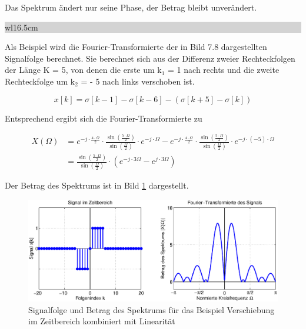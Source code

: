 \noindent Das Spektrum \"{a}ndert nur seine Phase, der Betrag bleibt unver\"{a}ndert.\bigskip

\noindent
\colorbox{lightgray}{%
%
\renewcommand\arraystretch{0.6}%
\begin{tabular}{ wl{16.5cm} }
{}
\end{tabular}%
}\medskip

\noindent Als Beispiel wird die Fourier-Transformierte der in Bild 7.8 dargestellten Signalfolge berechnet. Sie berechnet sich aus der Differenz zweier Rechteckfolgen der L\"{a}nge K = 5, von denen die erste um k${}_{1}$ = 1 nach rechts und die zweite Rechteckfolge um k${}_{2}$ = - 5 nach links verschoben ist. 

\begin{equation}\label{eq:sevenfiftyseven}
x\left[k\right]=\sigma \left[k-1\right]-\sigma \left[k-6\right]-\left(\sigma \left[k+5\right]-\sigma \left[k\right]\right)
\end{equation}

\noindent Entsprechend ergibt sich die Fourier-Transformierte zu

\begin{equation}\label{eq:sevenfiftyeight}
\begin{split}
X\left(\Omega \right) &=e^{-j\cdot \frac{4\cdot \Omega }{2} } \cdot \frac{\sin \left(\frac{5\cdot \Omega }{2} \right)}{\sin \left(\frac{\Omega }{2} \right)} \cdot e^{-j\cdot \Omega } -e^{-j\cdot \frac{4\cdot \Omega }{2} } \cdot \frac{\sin \left(\frac{5\cdot \Omega }{2} \right)}{\sin \left(\frac{\Omega }{2} \right)} \cdot e^{-j\cdot \left(-5\right)\cdot \Omega } \\
&=\frac{\sin \left(\frac{5\cdot \Omega }{2} \right)}{\sin \left(\frac{\Omega }{2} \right)} \cdot (e^{-j\cdot 3 \Omega }-e^{j\cdot 3 \Omega })
\end{split}
\end{equation}

\noindent Der Betrag des Spektrums ist in Bild \ref{fig:FourierVerschiebung} dargestellt.

\begin{figure}[H]
  \centerline{\includegraphics[width=1\textwidth]{Kapitel7/Bilder/image8.eps}}
  \caption{Signalfolge und Betrag des Spektrums f\"{u}r das Beispiel Verschiebung im Zeitbereich kombiniert mit Linearit\"{a}t}
  \label{fig:FourierVerschiebung}
\end{figure}

